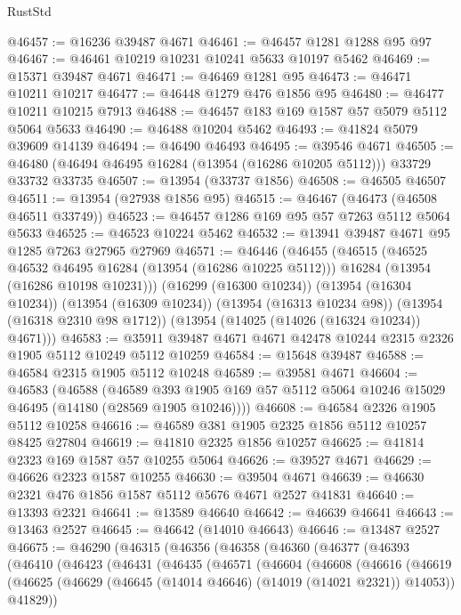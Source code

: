 \begin{lexlean}{RustStd}
\begin{coremodule}
@46457 := @16236 @39487 @4671
@46461 := @46457 @1281 @1288 @95 @97
@46467 := @46461 @10219 @10231 @10241 @5633 @10197 @5462
@46469 := @15371 @39487 @4671
@46471 := @46469 @1281 @95
@46473 := @46471 @10211 @10217
@46477 := @46448 @1279 @476 @1856 @95
@46480 := @46477 @10211 @10215 @7913
@46488 := @46457 @183 @169 @1587 @57 @5079 @5112 @5064 @5633
@46490 := @46488 @10204 @5462
@46493 := @41824 @5079 @39609 @14139
@46494 := @46490 @46493
@46495 := @39546 @4671
@46505 := @46480 (@46494 @46495 @16284 (@13954 (@16286 @10205 @5112))) @33729 @33732 @33735
@46507 := @13954 (@33737 @1856)
@46508 := @46505 @46507
@46511 := @13954 (@27938 @1856 @95)
@46515 := @46467 (@46473 (@46508 @46511 @33749))
@46523 := @46457 @1286 @169 @95 @57 @7263 @5112 @5064 @5633
@46525 := @46523 @10224 @5462
@46532 := @13941 @39487 @4671 @95 @1285 @7263 @27965 @27969
@46571 := @46446
    (@46455
      (@46515
        (@46525 @46532 @46495 @16284 (@13954 (@16286 @10225 @5112)))
        @16284
        (@13954 (@16286 @10198 @10231)))
      (@16299 (@16300 @10234))
      (@13954 (@16304 @10234))
      (@13954 (@16309 @10234))
      (@13954 (@16313 @10234 @98))
      (@13954 (@16318 @2310 @98 @1712))
      (@13954 (@14025 (@14026 (@16324 @10234)) @4671)))
@46583 := @35911 @39487 @4671 @4671 @42478 @10244 @2315 @2326 @1905 @5112 @10249 @5112 @10259
@46584 := @15648 @39487
@46588 := @46584 @2315 @1905 @5112 @10248
@46589 := @39581 @4671
@46604 := @46583
    (@46588
      (@46589 @393 @1905 @169 @57 @5112 @5064 @10246 @15029 @46495 (@14180 (@28569 @1905 @10246))))
@46608 := @46584 @2326 @1905 @5112 @10258
@46616 := @46589 @381 @1905 @2325 @1856 @5112 @10257 @8425 @27804
@46619 := @41810 @2325 @1856 @10257
@46625 := @41814 @2323 @169 @1587 @57 @10255 @5064
@46626 := @39527 @4671
@46629 := @46626 @2323 @1587 @10255
@46630 := @39504 @4671
@46639 := @46630 @2321 @476 @1856 @1587 @5112 @5676 @4671 @2527 @41831
@46640 := @13393 @2321
@46641 := @13589 @46640
@46642 := @46639 @46641
@46643 := @13463 @2527
@46645 := @46642 (@14010 @46643)
@46646 := @13487 @2527
@46675 := @46290
    (@46315
      (@46356
        (@46358
          (@46360
            (@46377
              (@46393
                (@46410
                  (@46423
                    (@46431
                      (@46435
                        (@46571
                          (@46604
                            (@46608
                              (@46616
                                (@46619
                                  (@46625
                                    (@46629 (@46645 (@14014 @46646) (@14019 (@14021 @2321)) @14053))
                                    @41829))

\end{coremodule}
\end{lexlean}
